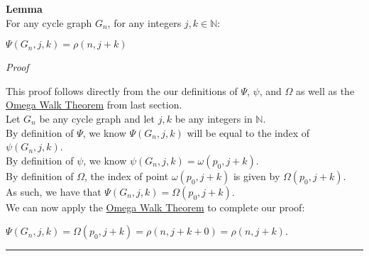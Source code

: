 \documentclass[a4paper,12pt]{article}
\begin{document}
\label{definition:state_function}
\hypertarget{definition:state_function}{}
\begin{tcolorbox}
\textbf{Lemma}\\
For any cycle graph $G_n$, for any integers $j,k \in \mathbb{N}$:

\begin{center}
$\Psi(G_n, j, k) = \rho(n, j + k)$
\end{center}

\end{tcolorbox}

\noindent
\textit{Proof}

\noindent This proof follows directly from the our definitions of $\Psi$, $\psi$, and $\Omega$ as well as the \hyperlink{theorem:omega_walk_theorem}{Omega Walk Theorem} from last section.\\

\noindent Let $G_n$ be any cycle graph and let $j, k$ be any integers in $\mathbb{N}$.\\

\noindent By definition of $\Psi$, we know $\Psi(G_n, j, k)$ will be equal to the index of  $\psi(G_n, j, k)$.\\

\noindent By definition of $\psi$, we know $\psi(G_n, j, k) = \omega(p_0, j + k)$.\\

\noindent By definition of $\Omega$, the index of point $\omega(p_0, j + k)$ is given by $\Omega(p_0, j + k)$.\\

\noindent As such, we have that $\Psi(G_n, j, k) = \Omega(p_0, j + k)$.\\

\noindent We can now apply the \hyperlink{theorem:omega_walk_theorem}{Omega Walk Theorem} to complete our proof:
\begin{center}
$\Psi(G_n, j, k) = \Omega(p_0, j + k) = \rho(n, j + k + 0) = \rho(n, j + k)$.
\end{center}

\begin{center}
\noindent\rule{8cm}{0.4pt}
\end{center}
\end{document}
